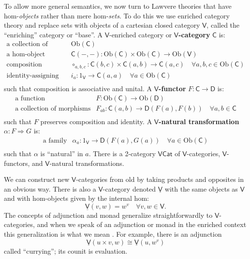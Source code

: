 \documentclass{amsart}
\theoremstyle{definition}
\newcommand{\Cat}{\mathsf{Cat}}
\newcommand{\V}{\mathsf{V}}
\newcommand{\D}{\mathsf{D}}
\newcommand{\C}{\mathsf{C}}
\newcommand{\Obj}{\mathrm{Ob}}
\newcommand{\maps}{\colon}
\begin{document}
To allow more general semantics, we now turn to Lawvere theories that have hom-\emph{objects} rather than mere hom-\emph{sets}.  To do this we use enriched category theory \cite{kelly} and replace sets with objects of a cartesian closed category $\V$, called the ``enriching'' category or ``base''.    A $\V$-enriched category or \textbf{$\V$-category} $\C$ is:
\[\begin{array}{rl}
\text{a collection of objects} & \Obj(\C)\\
\text{a hom-object function} & \C(-,-)\maps \Obj(\C) \times \Obj(\C) \to \Obj(\V)\\
\text{composition morphisms} & \circ_{a,b,c}\maps\C(b,c) \times \C(a,b) \to \C(a,c) \quad \forall a,b,c \in \Obj(\C)\\
\text{identity-assigning morphisms} & i_a\maps 1_\V \to\C(a,a) \quad \forall a \in \Obj(\C)\\
\end{array}\]
such that composition is associative and unital.  A \textbf{$\V$-functor} $F \maps \C \to \D$ is:
\[\begin{array}{rl}
\text{a function} & F\maps \Obj(\C) \to \Obj(\D)\\
\text{a collection of morphisms} & F_{ab}\maps \C(a,b) \to \D(F(a),F(b)) \quad \forall a,b \in \C\\
\end{array}\]
such that $F$ preserves composition and identity.  A \textbf{$\V$-natural transformation} $\alpha\maps F \Rightarrow G$ is:
\[\begin{array}{rl}
\text{a family} & \alpha_a \maps 1_\V \to \D(F(a),G(a)) \quad \forall a \in \Obj(\C)\\
\end{array}\]
such that $\alpha$ is ``natural'' in $a$.   There is a 2-category \textbf{$\V\Cat$} of $\V$-categories, $\V$-functors, and $\V$-natural transformations. 

We can construct new $\V$-categories from old by taking products and opposites in an obvious way.   There is also a $\V$-category denoted $\underline{\V}$ with the same objects as 
$\V$ and with hom-objects given by the internal hom:
\[   \underline{\V}(v,w) = w^v   \quad \forall v,w \in \V  .\]
The concepts of adjunction and monad generalize straightforwardly to $\V$-categories,
and when we speak of an adjunction or monad in the enriched context this generalization
is what we mean \cite{kelly}.   For example, there is an adjunction
\[    \underline{\V}(u \times v, w) \cong \underline{\V}(u, w^v ) \]
called ``currying''; its counit is evaluation.  
\end{document}
